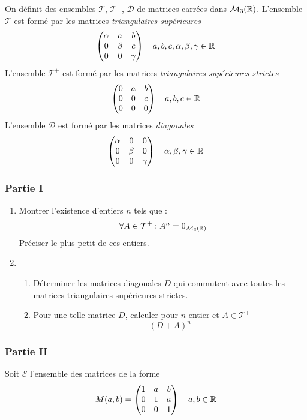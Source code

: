 On d{\'e}finit des ensembles $\mathcal{T}$, $\mathcal{T^+}$, $\mathcal{D}$ de matrices carr{\'e}es dans $\mathcal M_3(\mathbb{R})$.\newline
L'ensemble $\mathcal{T}$ est form{\'e} par les matrices \emph{triangulaires
sup{\'e}rieures}
\[\begin{pmatrix}
  \alpha & a & b \\
  0 & \beta & c \\
  0 & 0 & \gamma
\end{pmatrix} \quad a , b , c  , \alpha , \beta , \gamma \in \mathbb{R}
\]
L'ensemble $\mathcal{T^+}$ est form{\'e} par les matrices \emph{triangulaires
sup{\'e}rieures strictes}
\[\begin{pmatrix}
  0 & a & b \\
  0 & 0 & c \\
  0 & 0 & 0
\end{pmatrix} \quad a , b , c  \in \mathbb{R}
\]
L'ensemble $\mathcal{D}$ est form{\'e} par les matrices \emph{diagonales}
\[\begin{pmatrix}
  \alpha & 0 & 0 \\
  0 & \beta & 0 \\
  0 & 0 & \gamma
\end{pmatrix} \quad \alpha , \beta , \gamma \in \mathbb{R}\]

\subsubsection*{Partie I}
\begin{enumerate}
  \item Montrer l'existence d'entiers $n$ tels que :
  \[\forall A \in \mathcal{T^+} : A^n=
  0_{\mathcal{M}_3(\mathbb{R})}\]
  Pr{\'e}ciser le plus petit de ces entiers.
  \item
\begin{enumerate}
  \item D{\'e}terminer les matrices diagonales $D$ qui commutent avec
  toutes les matrices triangulaires sup{\'e}rieures strictes.
  \item Pour une telle matrice $D$, calculer pour $n$ entier et
  $A\in\mathcal{T}^+$
  \[(D+A)^n\]

\end{enumerate}

\end{enumerate}

\subsubsection*{Partie II}
Soit $\mathcal{E}$ l'ensemble des matrices de la forme
\[M(a,b)=\begin{pmatrix}
  1 & a & b \\
  0 & 1 & a \\
  0 & 0 & 1
\end{pmatrix} \quad a,b \in \mathbb{R}\]

